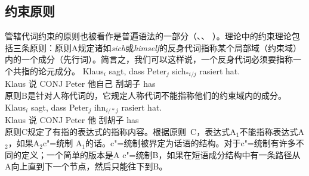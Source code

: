 \subsection{约束原则}

管辖代词约束的原则也被看作是普遍语法的一部分（\citealp[]{Chomsky98a-u}、\citealp*[]{CTK2009a}、 
\citealp[]{Rizzi2009a}）。\gb 理论中的约束理论包括三条原则：原则A规定诸如\emph{sich}或\emph{himself}的反身代词指称某个局部域（约束域）内的一个成分（先行词）。简言之，我们可以这样说，一个反身代词必须要指称一个共指的论元成分。
\ea
\gll Klaus$_i$ sagt, dass Peter$_j$ sich$_{*i/j}$ rasiert hat.\\
     Klaus     说 CONJ Peter 他自己 刮胡子 has\\
\z
原则B是针对人称代词的，它规定人称代词不能指称他们的约束域内的成分。
\ea
\gll Klaus$_i$ sagt, dass Peter$_j$ ihn$_{i/*j}$ rasiert hat.\\
	 Klaus 说 CONJ Peter 他 刮胡子 has\\ 
\z
原则C规定了有指的表达式的指称内容。根据原则~C，表达式A$_1$不能指称表达式A$_2$，如果A$_2$c"=统制 A$_1$的话。c"=统制被界定为话语的结构。对于c"=统制有许多不同的定义；一个简单的版本是A c"=统制B，如果在短语成分结构中有一条路径从A向上直到下一个节点，然后只能往下到B。

